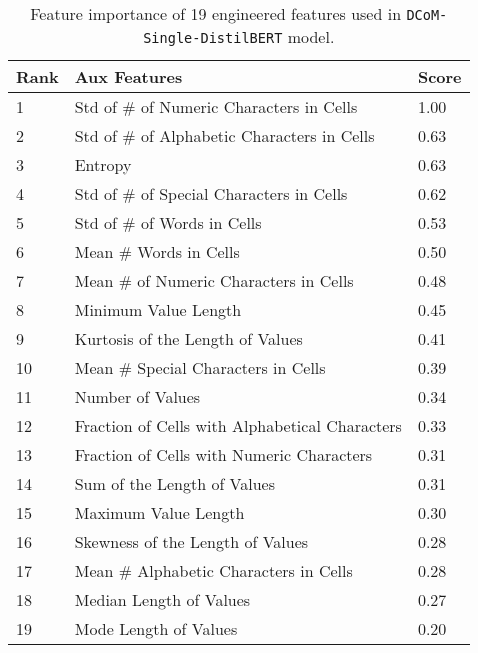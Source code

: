 \documentclass{article}
\begin{document}
\begin{table}[]
	\centering
	\begin{tabular}{lll}
		\hline
		\textbf{Rank} & \textbf{Aux Features}                                     & \textbf{Score} \\
		\hline
		1    & Std of \# of   Numeric Characters in Cells       & 1.00  \\
		2    & Std of \# of   Alphabetic Characters in Cells    & 0.63  \\
		3    & Entropy                                   & 0.63  \\
		4    & Std of \# of   Special Characters in Cells       & 0.62  \\
		5    & Std of \# of Words   in Cells                    & 0.53  \\
		6    & Mean \# Words in   Cells                         & 0.50  \\
		7    & Mean \# of Numeric   Characters in Cells         & 0.48  \\
		8    & Minimum Value   Length                           & 0.45  \\
		9    & Kurtosis of the   Length of Values               & 0.41  \\
		10   & Mean \# Special   Characters in Cells            & 0.39  \\
		11   & Number of Values                                 & 0.34  \\
		12   & Fraction of Cells   with Alphabetical Characters & 0.33  \\
		13   & Fraction of Cells   with Numeric Characters      & 0.31  \\
		14   & Sum of the Length   of Values                    & 0.31  \\
		15   & Maximum Value   Length                           & 0.30  \\
		16   & Skewness of the   Length of Values               & 0.28  \\
		17   & Mean \# Alphabetic   Characters in Cells         & 0.28  \\
		18   & Median Length of   Values                        & 0.27  \\
		19   & Mode Length of   Values                          & 0.20 \\
		\hline
	\end{tabular}
	\caption{Feature importance of 19 engineered features used in \texttt{DCoM-Single-DistilBERT} model.}
	\label{tab:feat_imp}
\end{table}
\end{document}
